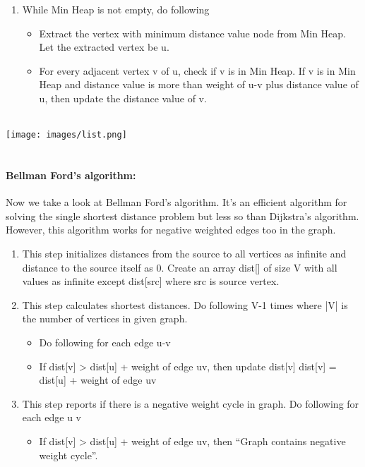 \documentclass[10pt]{article}
\begin{document}
\begin{multicols*}{2}
\begin{enumerate}
\item While Min Heap is not empty, do  following 
 \begin{itemize}
     \item Extract the vertex with minimum  distance value node from Min  Heap. Let the extracted vertex be u.
     \item For every adjacent vertex v of u, check if v is in Min Heap. If v is  in Min Heap and distance value  is more than weight of u-v plus  distance value of u, then update the distance value of v.\\\\


 \end{itemize}


\end{enumerate}

\texttt{[image: images/list.png]}\\\\

\paragraph{Bellman Ford's algorithm:}
Now we take a look at Bellman Ford's algorithm. It's an efficient algorithm for solving the single shortest distance problem but less so than Dijkstra's algorithm. However, this algorithm works for negative weighted edges too  in the graph.

\begin{enumerate}
    \item  This step initializes distances from the source  to all vertices as infinite and distance to the  source itself as 0. Create an array dist[] of
size V with all values as infinite except  
dist[src] where src is source vertex. 
\item This step calculates shortest distances. Do  following V-1 times where |V| is the number  of vertices in given graph.
\begin{itemize}
    \item Do following for each edge u-v 
    \item If dist[v] > dist[u] + weight of edge  
uv, then update dist[v] dist[v] =  
dist[u] + weight of edge uv 
\end{itemize}
\item This step reports if there is a negative weight  cycle in graph. Do following for each edge u v 
    \begin{itemize}
        \item  If dist[v] > dist[u] + weight of edge  
uv, then “Graph contains negative  
weight cycle”.\\\\
    \end{itemize}
 

\end{enumerate}
\end{multicols*}
\end{document}
